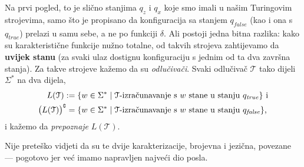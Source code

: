 Na prvi pogled, to je slično stanjima $q_z$ i $q_x$ koje smo imali u našim Turingovim strojevima, samo što je propisano da konfiguracija sa stanjem $q_{\mathit{false}}$ (kao i ona s $q_{\mathit{true}}$) prelazi u samu sebe, a ne po funkciji $\delta$. Ali postoji jedna bitna razlika: kako su karakteristične funkcije nužno totalne, od takvih strojeva zahtijevamo da \textbf{uvijek stanu} (za svaki ulaz dostignu konfiguraciju s jednim od ta dva završna stanja). Za takve strojeve kažemo da su \emph{odlučivači}. Svaki odlučivač $\mathcal T$ tako dijeli $\Sigma^*$ na dva dijela,
\begin{align}
    L(\mathcal T):=\{w\in\Sigma^*&\mid\text{$\mathcal T$-izračunavanje s $w$ stane u stanju $q_{\mathit{true}}$}\}
    \text{ i}\\ \bigl(L(\mathcal T)\big)\sp{{\scriptscriptstyle\complement}}=\{w\in\Sigma^*&\mid\text{$\mathcal T$-izračunavanje s $w$ stane u stanju $q_{\mathit{false}}$}\}\text,
\end{align} i kažemo da \emph{prepoznaje} $L(\mathcal T)$.

Nije preteško vidjeti da su te dvije karakterizacije, brojevna i jezična, povezane --- pogotovo jer već imamo napravljen najveći dio posla.

